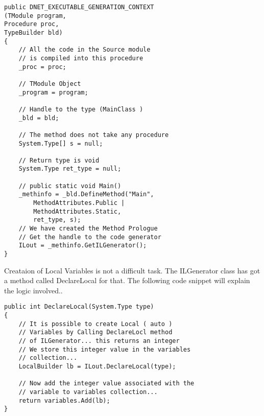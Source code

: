 \lstset{style=csharp}
\begin{lstlisting}
public DNET_EXECUTABLE_GENERATION_CONTEXT
(TModule program,
Procedure proc,
TypeBuilder bld)
{
	// All the code in the Source module 
	// is compiled into this procedure
	_proc = proc;
	
	// TModule Object
	_program = program;

	// Handle to the type (MainClass )
	_bld = bld;
	
	// The method does not take any procedure
	System.Type[] s = null;
	
	// Return type is void
	System.Type ret_type = null;
	
	// public static void Main()
	_methinfo = _bld.DefineMethod("Main",
		MethodAttributes.Public | 
		MethodAttributes.Static,
		ret_type, s);
	// We have created the Method Prologue
	// Get the handle to the code generator
	ILout = _methinfo.GetILGenerator();
}
\end{lstlisting}
Creataion of Local Variables is not a difficult task. The ILGenerator class has got a method called DeclareLocal for that.
The following code snippet will explain the logic involved..

\lstset{style=csharp}
\begin{lstlisting}
public int DeclareLocal(System.Type type)
{
	// It is possible to create Local ( auto )
	// Variables by Calling DeclareLocl method
	// of ILGenerator... this returns an integer
	// We store this integer value in the variables
	// collection...
	LocalBuilder lb = ILout.DeclareLocal(type);

	// Now add the integer value associated with the
	// variable to variables collection...
	return variables.Add(lb);
}
\end{lstlisting}

